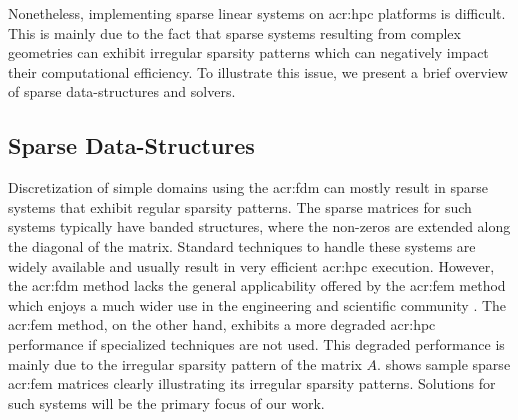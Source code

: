 Nonetheless, implementing sparse linear systems on \gls{acr:hpc} platforms is difficult.
This is mainly due to the fact that sparse systems resulting from complex geometries can exhibit irregular sparsity patterns which can negatively impact their computational efficiency.
To illustrate this issue, we present a brief overview of sparse data-structures and solvers.


\subsection{Sparse Data-Structures}

Discretization of simple domains using the \gls{acr:fdm} can mostly result in sparse systems that exhibit regular sparsity patterns.
The sparse matrices for such systems typically have banded structures, where the non-zeros are extended along the diagonal of the matrix.
Standard techniques to handle these systems are widely available and usually result in very efficient \gls{acr:hpc} execution.
However, the \gls{acr:fdm} method lacks the general applicability offered by the \gls{acr:fem} method which enjoys a much wider use in the engineering and scientific community \cite[p. 19]{bib:Jin2002TFEMIE}.
The \gls{acr:fem} method, on the other hand, exhibits a more degraded \gls{acr:hpc} performance if specialized techniques are not used.
This degraded performance is mainly due to the irregular sparsity pattern of the matrix $A$.
 shows sample sparse \gls{acr:fem} matrices clearly illustrating its irregular sparsity patterns.
Solutions for such systems will be the primary focus of our work.

